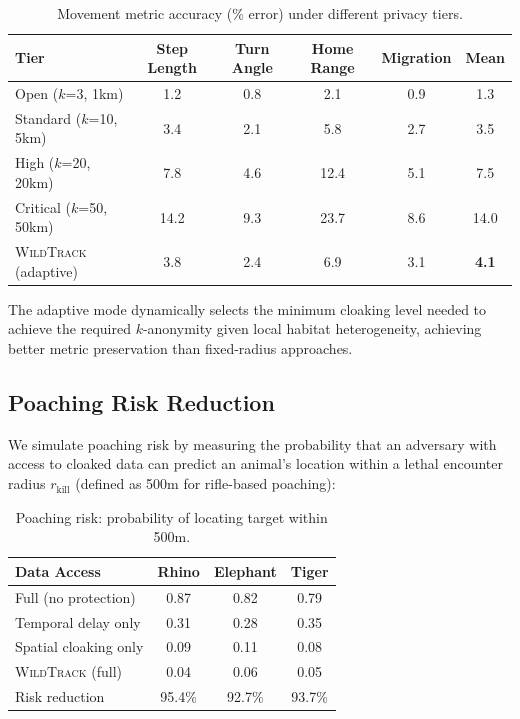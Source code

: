 \documentclass[11pt,letterpaper]{article}
\newcommand{\WildTrack}{\textsc{WildTrack}}
\begin{document}
\begin{table}[htbp]
\centering
\caption{Movement metric accuracy (\% error) under different privacy tiers.}
\label{tab:privacy_utility}
\begin{tabular}{lccccc}
\toprule
\textbf{Tier} & \textbf{Step Length} & \textbf{Turn Angle} & \textbf{Home Range} & \textbf{Migration} & \textbf{Mean} \\
\midrule
Open ($k$=3, 1km) & 1.2 & 0.8 & 2.1 & 0.9 & 1.3 \\
Standard ($k$=10, 5km) & 3.4 & 2.1 & 5.8 & 2.7 & 3.5 \\
High ($k$=20, 20km) & 7.8 & 4.6 & 12.4 & 5.1 & 7.5 \\
Critical ($k$=50, 50km) & 14.2 & 9.3 & 23.7 & 8.6 & 14.0 \\
\midrule
\WildTrack{} (adaptive) & 3.8 & 2.4 & 6.9 & 3.1 & \textbf{4.1} \\
\bottomrule
\end{tabular}
\end{table}

The adaptive mode dynamically selects the minimum cloaking level needed to achieve the required $k$-anonymity given local habitat heterogeneity, achieving better metric preservation than fixed-radius approaches.

\subsection{Poaching Risk Reduction}

We simulate poaching risk by measuring the probability that an adversary with access to cloaked data can predict an animal's location within a lethal encounter radius $r_{\text{kill}}$ (defined as 500m for rifle-based poaching):

\begin{table}[htbp]
\centering
\caption{Poaching risk: probability of locating target within 500m.}
\label{tab:poach_risk}
\begin{tabular}{lccc}
\toprule
\textbf{Data Access} & \textbf{Rhino} & \textbf{Elephant} & \textbf{Tiger} \\
\midrule
Full (no protection) & 0.87 & 0.82 & 0.79 \\
Temporal delay only & 0.31 & 0.28 & 0.35 \\
Spatial cloaking only & 0.09 & 0.11 & 0.08 \\
\WildTrack{} (full) & 0.04 & 0.06 & 0.05 \\
\midrule
Risk reduction & 95.4\% & 92.7\% & 93.7\% \\
\bottomrule
\end{tabular}
\end{table}
\end{document}
